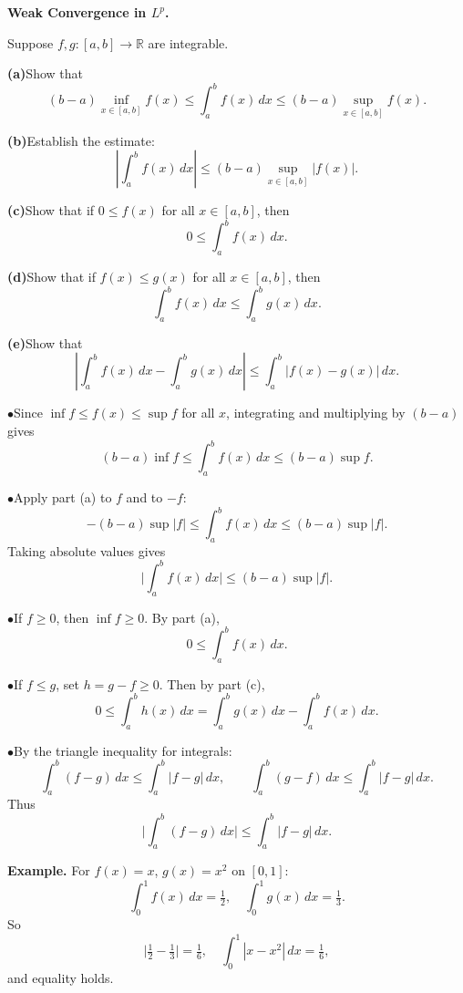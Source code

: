 \begin{problem}[CP-II-0141]
\label{prob:cp-ii-0141}
\textbf{Weak Convergence in \(L^p\).}

\hspace*{1.5em}Suppose $f,g:[a,b]\to\mathbb{R}$ are integrable.

	\par\smallskip\noindent\textbf{(a)}\quad Show that
	\[
	(b-a)\inf_{x\in[a,b]} f(x) \leq \int_a^b f(x)\,dx \leq (b-a)\sup_{x\in[a,b]} f(x).
	\]

	\par\smallskip\noindent\textbf{(b)}\quad Establish the estimate:
	\[
	\left|\int_a^b f(x)\,dx\right| \leq (b-a)\sup_{x\in[a,b]} |f(x)|.
	\]

	\par\smallskip\noindent\textbf{(c)}\quad Show that if $0 \leq f(x)$ for all $x \in [a,b]$, then
	\[
	0 \leq \int_a^b f(x)\,dx.
	\]

	\par\smallskip\noindent\textbf{(d)}\quad Show that if $f(x)\leq g(x)$ for all $x \in [a,b]$, then
	\[
	\int_a^b f(x)\,dx \leq \int_a^b g(x)\,dx.
	\]

	\par\smallskip\noindent\textbf{(e)}\quad Show that
	\[
	\left|\int_a^b f(x)\,dx - \int_a^b g(x)\,dx\right| \leq \int_a^b |f(x)-g(x)|\,dx.
	\]
\end{problem}

\begin{solution}
\par\smallskip\noindent\(\bullet\)\quad Since $\inf f \leq f(x)\leq \sup f$ for all $x$, integrating and multiplying by $(b-a)$ gives
		\[
		(b-a)\inf f \leq \int_a^b f(x)\,dx \leq (b-a)\sup f.
		\]

		\par\smallskip\noindent\(\bullet\)\quad Apply part (a) to $f$ and to $-f$:
		\[
		-(b-a)\sup|f|\leq \int_a^b f(x)\,dx \leq (b-a)\sup|f|.
		\]
		Taking absolute values gives
		\[
		\Big|\int_a^b f(x)\,dx\Big|\leq (b-a)\sup|f|.
		\]

		\par\smallskip\noindent\(\bullet\)\quad If $f\geq 0$, then $\inf f \geq 0$. By part (a),
		\[
		0\leq \int_a^b f(x)\,dx.
		\]

		\par\smallskip\noindent\(\bullet\)\quad If $f\leq g$, set $h=g-f\geq 0$. Then by part (c),
		\[
		0\leq \int_a^b h(x)\,dx = \int_a^b g(x)\,dx-\int_a^b f(x)\,dx.
		\]

		\par\smallskip\noindent\(\bullet\)\quad By the triangle inequality for integrals:
		\[
		\int_a^b (f-g)\,dx \leq \int_a^b |f-g|\,dx, \qquad
		\int_a^b (g-f)\,dx \leq \int_a^b |f-g|\,dx.
		\]
		Thus
		\[
		\Big|\int_a^b (f-g)\,dx\Big| \leq \int_a^b |f-g|\,dx.
		\]

		\textbf{Example.} For $f(x)=x$, $g(x)=x^2$ on $[0,1]$:
		\[
		\int_0^1 f(x)\,dx=\tfrac12, \quad \int_0^1 g(x)\,dx=\tfrac13.
		\]
		So
		\[
		\Big|\tfrac12-\tfrac13\Big|=\tfrac16, \quad \int_0^1 |x-x^2|\,dx=\tfrac16,
		\]
		and equality holds.
\end{solution}


